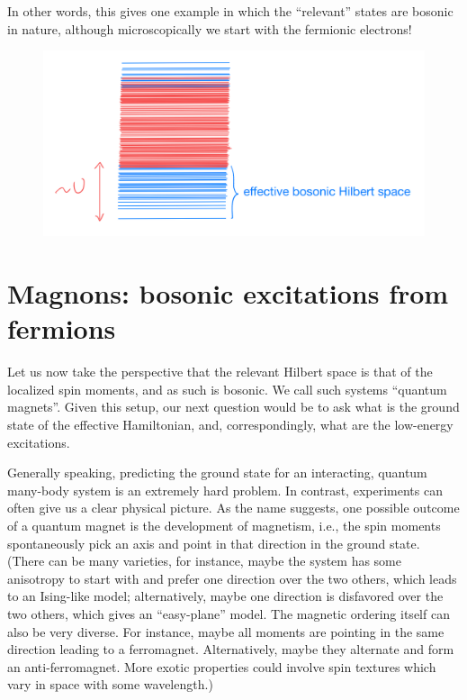 In other words, this gives one example in which the ``relevant'' states are bosonic in nature, although microscopically we start with the fermionic electrons!
\begin{figure}[H]
    \centering
    \includegraphics[width=\textwidth]{jupyterbook/data/fig/lec25-fig04.png}
\end{figure}

\section{Magnons: bosonic excitations from fermions}

Let us now take the perspective that the relevant Hilbert space is that of the localized spin moments, and as such is bosonic. We call such systems ``quantum magnets''. Given this setup, our next question would be to ask what is the ground state of the effective Hamiltonian, and, correspondingly, what are the low-energy excitations.

Generally speaking, predicting the ground state for an interacting, quantum many-body system is an extremely hard problem. In contrast, experiments can often give us a clear physical picture. As the name suggests, one possible outcome of a quantum magnet is the development of magnetism, i.e., the spin moments spontaneously pick an axis and point in that direction in the ground state. (There can be many varieties, for instance, maybe the system has some anisotropy to start with and prefer one direction over the two others, which leads to an Ising-like model; alternatively, maybe one direction is disfavored over the two others, which gives an ``easy-plane'' model. The magnetic ordering itself can also be very diverse. For instance, maybe all moments are pointing in the same direction leading to a ferromagnet. Alternatively, maybe they alternate and form an anti-ferromagnet. More exotic properties could involve spin textures which vary in space with some wavelength.)

